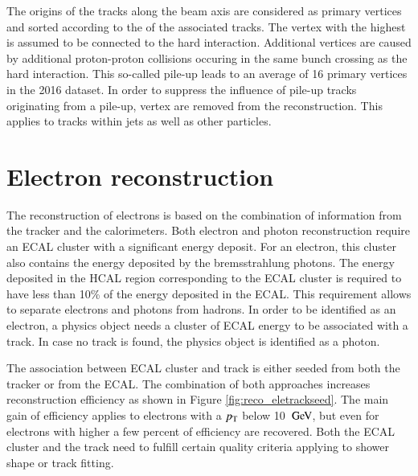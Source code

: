 The origins of the tracks along the beam axis are considered as primary vertices and sorted according to the \pt of the associated tracks.
The vertex with the highest \pt is assumed to be connected to the hard interaction. 
Additional vertices are caused by additional proton-proton collisions occuring in the same bunch crossing as the hard interaction.
This so-called pile-up leads to an average of 16 primary vertices in the 2016 dataset. In order to suppress the influence of pile-up tracks originating from
a pile-up, vertex are removed from the reconstruction. This applies to tracks within jets as well as other particles.

\section{Electron reconstruction}
\label{sec:SimReco_Ele}


The reconstruction of electrons is based on the combination of information from the tracker and the calorimeters.
Both electron and photon reconstruction require an ECAL cluster with a significant energy deposit.
For an electron, this cluster also contains the energy deposited by the bremsstrahlung photons.
The energy deposited in the HCAL region corresponding to the ECAL cluster is required to have less than 10\% of the energy deposited in the ECAL.
This requirement allows to separate electrons and photons from hadrons.
In order to be identified as an electron, a physics object needs a cluster of ECAL energy to be associated with a track.
In case no track is found, the physics object is identified as a photon.

The association between ECAL cluster and track is either seeded from both the tracker or from the ECAL.
The combination of both approaches increases reconstruction efficiency as shown in Figure \ref{fig:reco_eletrackseed}.
The main gain of efficiency applies to electrons with a $p_{\mathrm{T}}$ below 10 $\,\text{Ge\hspace{-.08em}V}$, but even for electrons with higher \pt a few percent of efficiency are recovered.
Both the ECAL cluster and the track need to fulfill certain quality criteria applying to shower shape or track fitting.

